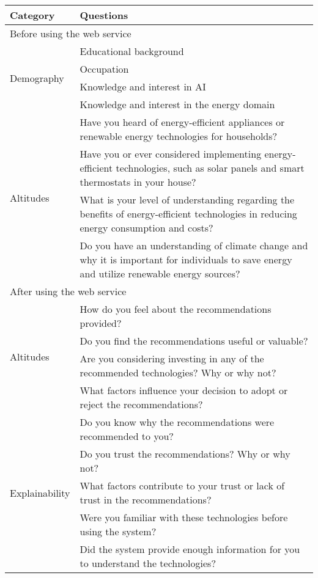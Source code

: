 \begin{center}
  \small
  \begin{longtable}{ | p{} | p{} | }
    \hline
    \textbf{Category} & \textbf{Questions} \\
    \hline
    \multicolumn{2}{|l|}{\cellcolor{cyan}Before using the web service} \\
    \hline
    \multirow{4}{4em}{Demography} & Educational background \\
    & Occupation \\
    & Knowledge and interest in AI \\
    & Knowledge and interest in the energy domain \\
    \hline
    \multirow{4}{4em}{Altitudes} & Have you heard of energy-efficient appliances or renewable energy technologies for households? \\
    & Have you or ever considered implementing energy-efficient technologies, such as solar panels and smart thermostats in your house? \\
    & What is your level of understanding regarding the benefits of energy-efficient technologies in reducing energy consumption and costs? \\
    & Do you have an understanding of climate change and why it is important for individuals to save energy and utilize renewable energy sources? \\
    \hline
    \multicolumn{2}{|l|}{\cellcolor{cyan}After using the web service} \\
    \hline
    \multirow{4}{4em}{Altitudes} & How do you feel about the recommendations provided? \\
    & Do you find the recommendations useful or valuable? \\
    & Are you considering investing in any of the recommended technologies? Why or why not? \\
    & What factors influence your decision to adopt or reject the recommendations? \\
    \hline
    \multirow{7}{4em}{Explainability} & Do you know why the recommendations were recommended to you? \\
    & Do you trust the recommendations? Why or why not? \\
    & What factors contribute to your trust or lack of trust in the recommendations? \\
    & Were you familiar with these technologies before using the system? \\
    & Did the system provide enough information for you to understand the technologies? \\

\end{longtable}
\end{center}
